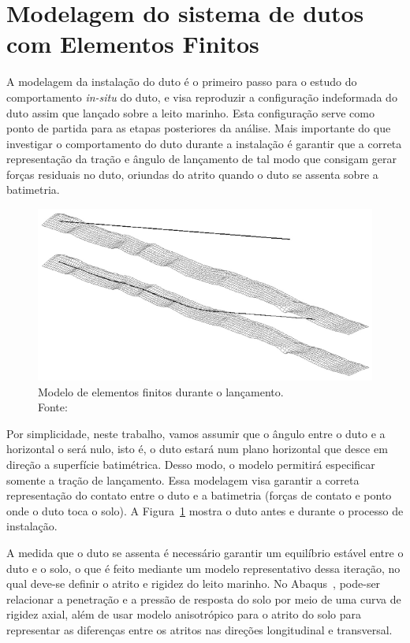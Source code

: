 \section{Modelagem do sistema de dutos com Elementos Finitos}

A modelagem da instalação do duto é o primeiro passo para o estudo do comportamento \textit{in-situ} do duto, e visa reproduzir a configuração indeformada do duto assim que lançado sobre a leito marinho.
Esta configuração serve como ponto de partida para as etapas posteriores da análise.
Mais importante do que investigar o comportamento do duto durante a instalação é garantir que a correta representação da tração e ângulo de lançamento de tal modo que consigam gerar forças residuais no duto, oriundas do atrito quando o duto se assenta sobre a batimetria.

\begin{figure}[th!]
    \centering
    \includegraphics[width=0.7\linewidth]{imagens/lancamento_do_duto}
    \caption[Modelo de elementos finitos durante o lançamento]{Modelo de elementos finitos durante o lançamento.\\Fonte: \cite{Bai2014}}
    \label{fig:lancamentododuto}
\end{figure}

Por simplicidade, neste trabalho, vamos assumir que o ângulo entre o duto e a horizontal o será nulo, isto é, o duto estará num plano horizontal que desce em direção a superfície batimétrica.
Desso modo, o modelo permitirá especificar somente a tração de lançamento.
Essa modelagem visa garantir a correta representação do contato entre o duto e a batimetria (forças de contato e ponto onde o duto toca o solo).
A Figura~\ref{fig:lancamentododuto} mostra o duto antes e durante o processo de instalação.

A medida que o duto se assenta é necessário garantir um equilíbrio estável entre o duto e o solo, o que é feito mediante um modelo representativo dessa iteração, no qual deve-se definir o atrito e rigidez do leito marinho.
No Abaqus~\cite{Simulia2018}, pode-ser relacionar a penetração e a pressão de resposta do solo por meio de uma curva de rigidez axial, além de usar modelo anisotrópico para o atrito do solo para representar as diferenças entre os atritos nas direções longitudinal e transversal.
